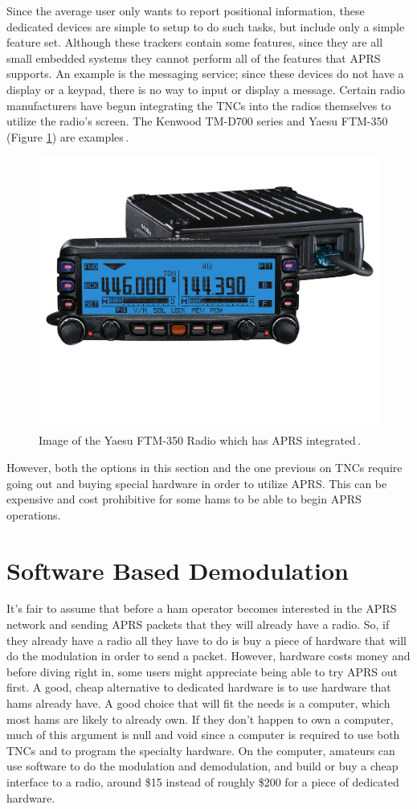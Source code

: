 Since the average user only wants to report positional information, these dedicated devices are simple to setup to do such tasks, but include only a simple feature set. Although these trackers contain some features, since they are all small embedded systems they cannot perform all of the features that APRS supports. An example is the messaging service; since these devices do not have a display or a keypad, there is no way to input or display a message. Certain radio manufacturers have begun integrating the TNCs into the radios themselves to utilize the radio's screen. The Kenwood TM-D700 series and Yaesu FTM-350 (Figure \ref{yaesuFTM350}) are examples\,\cite{Kenwood,Yaesu}.

\begin{figure}
  \centering
	\includegraphics[width=0.75\linewidth]{images/FTM-350US_F.jpg} 
	\caption{Image of the Yaesu FTM-350 Radio which has APRS integrated\,\cite{Yaesua}.}
   \label{yaesuFTM350}
\end{figure}

However, both the options in this section and the one previous on TNCs require going out and buying special hardware in order to utilize APRS. This can be expensive and cost prohibitive for some hams to be able to begin APRS operations.

\section{Software Based Demodulation}
It's fair to assume that before a ham operator becomes interested in the APRS network and sending APRS packets that they will already have a radio. So, if they already have a radio all they have to do is buy a piece of hardware that will do the modulation in order to send a packet. However, hardware costs money and before diving right in, some users might appreciate being able to try APRS out first. A good, cheap alternative to dedicated hardware is to use hardware that hams already have. A good choice that will fit the needs is a computer, which most hams are likely to already own. If they don't happen to own a computer, much of this argument is null and void since a computer is required to use both TNCs and to program the specialty hardware. On the computer, amateurs can use software to do the modulation and demodulation, and build or buy a cheap interface to a radio, around \$15 instead of roughly \$200 for a piece of dedicated hardware.

